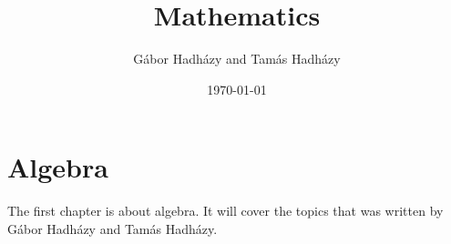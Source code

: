 \documentclass[a4paper,12pt]{book}
\author{Gábor Hadházy and Tamás Hadházy}
\title{Mathematics}
\date{\today}
\begin{document}
\maketitle

\tableofcontents

\chapter{Algebra}
The first chapter is about algebra. It will cover the topics that was written by Gábor Hadházy and Tamás Hadházy.
\end{document}
